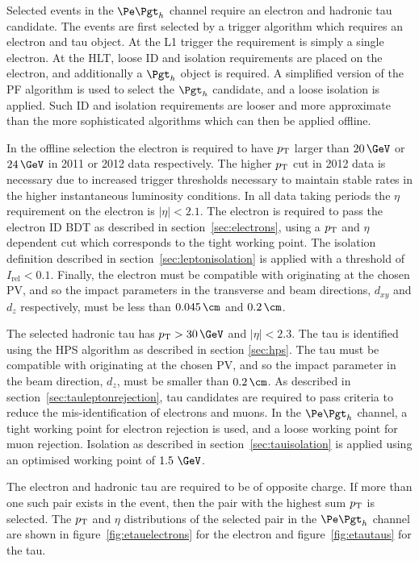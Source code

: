 Selected events in the $\etau$ channel require an electron and hadronic tau
candidate. The events are first selected by a trigger algorithm which requires
an electron and tau object. At the \ac{L1} trigger the requirement is simply a
single electron. At the \ac{HLT}, loose ID and isolation requirements are placed on the
electron, and additionally a $\Pgth$ object is required. A simplified version of
the \ac{PF} algorithm is used to select the $\Pgth$ candidate, and a loose
isolation is applied. Such ID and isolation requirements are looser and more approximate
than the more sophisticated algorithms which can then be applied offline.  

In the offline selection the electron is required to have $p_{\mathrm{T}}$ larger than $20\,\GeV$
or $24\,\GeV$ in 2011 or 2012 data respectively. The higher $p_{\mathrm{T}}$ cut in 2012 data is necessary
due to increased trigger thresholds necessary to maintain stable rates in the
higher instantaneous luminosity conditions. In all data taking periods the $\eta$ requirement
on the electron is $|\eta| < 2.1$. The electron is required to pass the electron
ID \ac{BDT} as described in section~\ref{sec:electrons}, using a $p_{\mathrm{T}}$ and
$\eta$ dependent cut which corresponds to the tight working point.  
The isolation definition described in section~\ref{sec:leptonisolation} is
applied with a threshold of $I_{\text{rel}} < 0.1$. Finally, the electron must be compatible with
originating at the chosen \ac{PV}, and so the impact parameters in the
transverse and beam directions, $d_{xy}$ and $d_{z}$ respectively, must be 
less than $0.045\,\cm$ and $0.2\,\cm$. 

The selected hadronic tau has $\pt > 30\,\GeV$ and $|\eta|<2.3$. 
The tau is identified using the \ac{HPS} algorithm as described in 
section \ref{sec:hps}. The tau must be compatible with
originating at the chosen \ac{PV}, and so the impact parameter in the beam
direction, $d_{z}$, must be smaller than $0.2\,\cm$. %
As described in section~\ref{sec:tauleptonrejection}, 
tau candidates are required to pass criteria to reduce the mis-identification of electrons and
muons. In the $\etau$ channel, a tight working point for electron rejection is
used, and a loose working point for muon rejection. Isolation as described in
section~\ref{sec:tauisolation} is applied using an optimised working point of
$1.5~\GeV$.  

The electron and hadronic tau are required to be of opposite charge. If more
than one such pair exists in the event, then the pair with the highest sum $p_{\mathrm{T}}$
is selected. The $p_{\mathrm{T}}$ and $\eta$ distributions of the selected pair in the
$\etau$ channel are shown in figure~\ref{fig:etauelectrons} for the electron and
figure~\ref{fig:etautaus} for the tau. 


